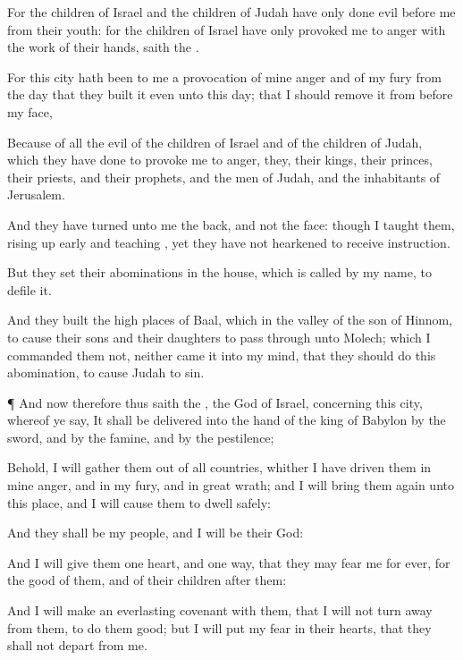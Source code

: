 {For the
children of
Israel and the
children of
Judah have only
done
evil
before me from their
youth: for the
children of
Israel have only provoked me to
anger with the
work of their
hands,
saith the
{}.

For this
city hath been to me
{} a provocation of mine
anger and of my
fury from the
day that they
built it even unto this
day; that I should
remove it from before my
face,

Because of all the
evil of the
children of
Israel and of the
children of
Judah, which they have
done to provoke me to
anger, they, their
kings, their
princes, their
priests, and their
prophets, and the
men of
Judah, and the
inhabitants of
Jerusalem.

And they have
turned unto me the
back, and not the
face: though I
taught them, rising up
early and
teaching
{}, yet they have not
hearkened to
receive
instruction.

But they
set their
abominations in the
house, which is
called by my
name, to
defile it.

And they
built the high
places of
Baal, which
{} in the
valley of the
son of
Hinnom, to cause their
sons and their
daughters to
pass through
{} unto
Molech; which I
commanded them not, neither
came it into my
mind, that they should
do this
abomination, to cause
Judah to
sin.


\par }{\PP {}¶ And now therefore thus
saith the
{}, the
God of
Israel, concerning this
city, whereof ye
say, It shall be
delivered into the
hand of the
king of
Babylon by the
sword, and by the
famine, and by the
pestilence;

Behold, I will gather them
out of all
countries, whither I have
driven them in mine
anger, and in my
fury, and in
great
wrath; and I will bring them
again unto this
place, and I will cause them to
dwell
safely:

And they shall be my
people, and I will be their
God:

And I will
give them
one
heart, and
one
way, that they may
fear me for
ever, for the
good of them, and of their
children
after them:

And I will
make an
everlasting
covenant with them, that I will not turn
away from
them, to do them
good; but I will
put my
fear in their
hearts, that they shall not
depart from me.

}
